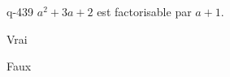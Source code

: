 \begin{truefalse}{q-439}
$a^2+3a+2$ est factorisable par $a+1$.
\item* Vrai
\item Faux
\end{truefalse}

